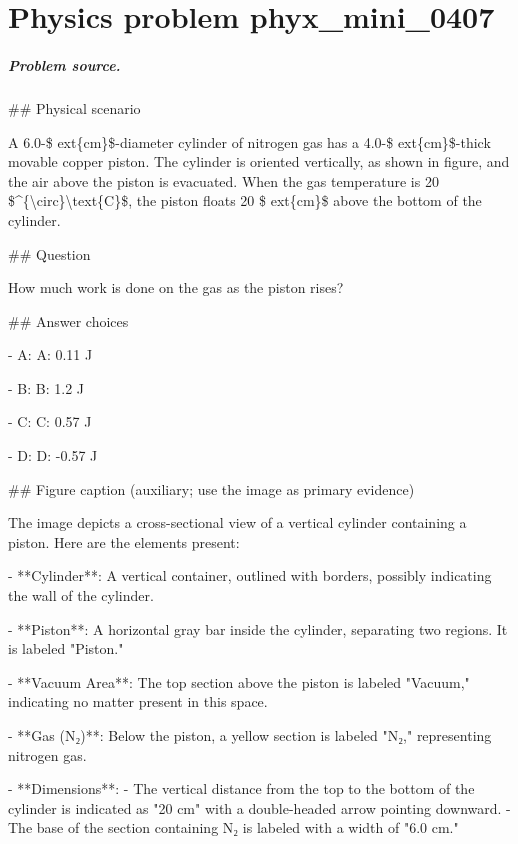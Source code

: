 
\chapter{Physics problem phyx\_mini\_0407}
\label{ch:PhyXMiniProblems_problem_phyx_mini_0407}

\paragraph{Problem source.}
\#\# Physical scenario

A 6.0-\$	ext\{cm\}\$-diameter cylinder of nitrogen gas has a 4.0-\$	ext\{cm\}\$-thick movable copper piston. The cylinder is oriented vertically, as shown in figure, and the air above the piston is evacuated. When the gas temperature is 20 \$\textasciicircum{}\{\textbackslash{}circ\}\textbackslash{}text\{C\}\$, the piston floats 20 \$	ext\{cm\}\$ above the bottom of the cylinder.

\#\# Question

How much work is done on the gas as the piston rises?

\#\# Answer choices

- A: A: 0.11 J

- B: B: 1.2 J

- C: C: 0.57 J

- D: D: -0.57 J

\#\# Figure caption (auxiliary; use the image as primary evidence)

The image depicts a cross-sectional view of a vertical cylinder containing a piston. Here are the elements present:

- **Cylinder**: A vertical container, outlined with borders, possibly indicating the wall of the cylinder.

- **Piston**: A horizontal gray bar inside the cylinder, separating two regions. It is labeled "Piston."

- **Vacuum Area**: The top section above the piston is labeled "Vacuum," indicating no matter present in this space.

- **Gas (N₂)**: Below the piston, a yellow section is labeled "N₂," representing nitrogen gas.

- **Dimensions**: 
  - The vertical distance from the top to the bottom of the cylinder is indicated as "20 cm" with a double-headed arrow pointing downward.
  - The base of the section containing N₂ is labeled with a width of "6.0 cm."

